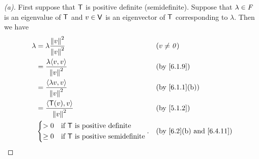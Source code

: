 \begin{proof}[(a)]
  First suppose that \(\mathsf{T}\) is positive definite (semidefinite).
  Suppose that \(\lambda \in \mathit{F}\) is an eigenvalue of \(\mathsf{T}\) and \(v \in \mathsf{V}\) is an eigenvector of \(\mathsf{T}\) corresponding to \(\lambda\).
  Then we have
  \begin{align*}
    \lambda & = \lambda \dfrac{\norm{v}^2}{\norm{v}^2}                   &  & (v \neq \zv)  \\
            & = \dfrac{\lambda \inn{v, v}}{\norm{v}^2}                   &  & \by{6.1.9}    \\
            & = \dfrac{\inn{\lambda v, v}}{\norm{v}^2}                   &  & \by{6.1.1}[b] \\
            & = \dfrac{\inn{\T(v), v}}{\norm{v}^2}                       &  & \by{5.1.2}    \\
            & \begin{dcases}
                > 0    & \text{if } \T \text{ is positive definite}     \\
                \geq 0 & \text{if } \T \text{ is positive semidefinite}
              \end{dcases}. &  & \text{(by \cref{6.2}(b) and \cref{6.4.11})}
  \end{align*}


\end{proof}
